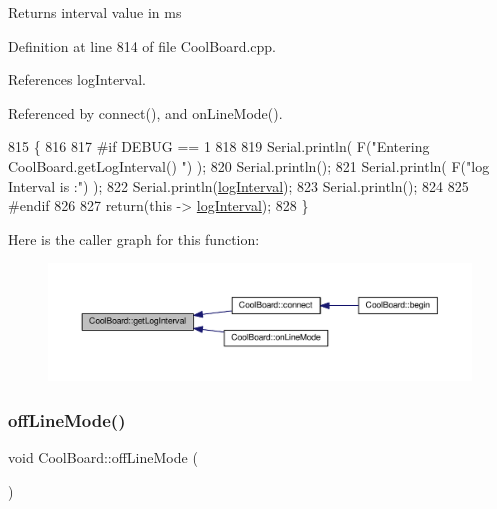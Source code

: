 \begin{DoxyReturn}{Returns}
interval value in ms 
\end{DoxyReturn}


Definition at line 814 of file Cool\+Board.\+cpp.



References log\+Interval.



Referenced by connect(), and on\+Line\+Mode().


\begin{DoxyCode}
815 \{
816 
817 \textcolor{preprocessor}{#if DEBUG == 1}
818 
819     Serial.println( F(\textcolor{stringliteral}{"Entering CoolBoard.getLogInterval() "}) );
820     Serial.println();
821     Serial.println( F(\textcolor{stringliteral}{"log Interval is :"}) );
822     Serial.println(\hyperlink{classCoolBoard_a4de0096d575d66b472c4c1f0111fd452}{logInterval});
823     Serial.println();
824 
825 \textcolor{preprocessor}{#endif}
826 
827     \textcolor{keywordflow}{return}(\textcolor{keyword}{this} -> \hyperlink{classCoolBoard_a4de0096d575d66b472c4c1f0111fd452}{logInterval});
828 \}
\end{DoxyCode}
Here is the caller graph for this function\+:\nopagebreak
\begin{figure}[H]
\begin{center}
\leavevmode
\includegraphics[width=350pt]{classCoolBoard_aaa24480b273fc095a1356a589c333781_icgraph}
\end{center}
\end{figure}
\mbox{\label{classCoolBoard_ae6b5e1274d760462290192acea4adca8}} 
\subsubsection{\texorpdfstring{off\+Line\+Mode()}{offLineMode()}}
{\footnotesize\ttfamily void Cool\+Board\+::off\+Line\+Mode (\begin{DoxyParamCaption}{ }\end{DoxyParamCaption})}

